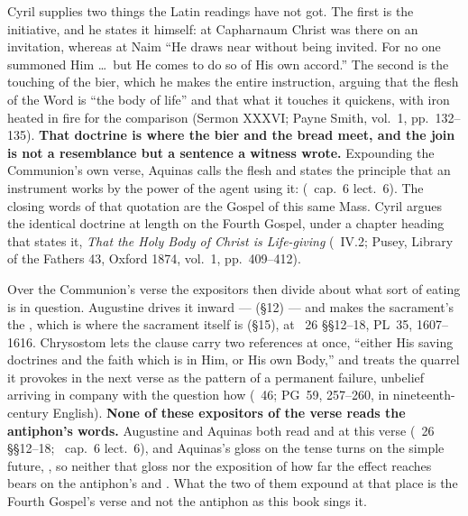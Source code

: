 Cyril supplies two things the Latin readings have not got. The first is the
initiative, and he states it himself: at Capharnaum Christ was there on an
invitation, whereas at Naim ``He draws near without being invited. For no one
summoned Him \dots\ but He comes to do so of His own accord.'' The second is
the touching of the bier, which he makes the
entire instruction, arguing that the flesh of the Word is ``the body of life''
and that what it touches it quickens, with iron heated in fire for the
comparison (Sermon XXXVI; Payne Smith, vol.~1, pp.~132--135). \textbf{That
doctrine is where the bier and the bread meet, and the join is not a
resemblance but a sentence a witness wrote.} Expounding the Communion's own
verse, Aquinas calls the flesh  and states the
principle that an instrument works by the power of the agent using it:
 (\ cap.~6 lect.~6). The closing words of that
quotation are the Gospel of this same Mass. Cyril argues the identical
doctrine at length on the Fourth Gospel, under a chapter heading that states
it, \emph{That the Holy Body of Christ is Life-giving} (~IV.2; Pusey, Library of the Fathers 43, Oxford 1874, vol.~1,
pp.~409--412).

Over the Communion's verse the expositors then divide about what sort of
eating is in question. Augustine drives it inward ---  (§12) --- and
makes the sacrament's  the , which is  where the sacrament itself is  (§15), at ~26 §§12--18, PL~35, 1607--1616.
Chrysostom lets the clause carry two references at once, ``either His saving
doctrines and the faith which is in Him, or His own Body,'' and treats the
quarrel it provokes in the next verse as the pattern of a permanent failure,
unbelief arriving in company with the question how (~46;
PG~59, 257--260, in nineteenth-century English). \textbf{None of these
expositors of the verse reads the antiphon's words.} Augustine and Aquinas both read  and  at this verse (~26 §§12--18; \ cap.~6 lect.~6), and Aquinas's gloss on the tense turns on the simple
future, , so
neither that gloss nor the exposition of how far the effect reaches bears on
the antiphon's  and . What the two
of them expound at that place is the Fourth Gospel's verse and not the
antiphon as this book sings it.

